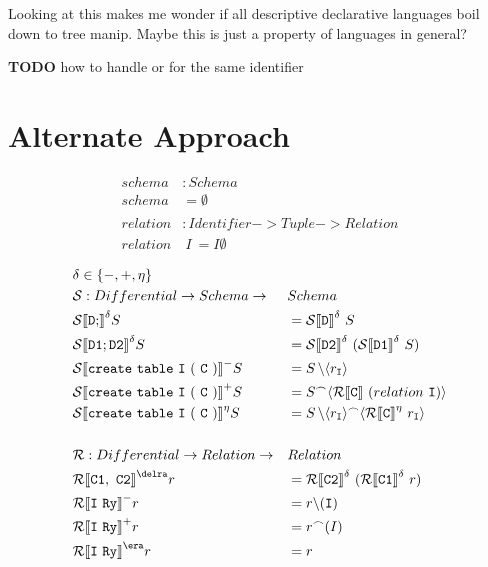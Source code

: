 \documentclass[12pt]{article}
\newcommand{\cmp}[2]{
  \mathcal{#1}|[ \mathtt{ \StrSubstitute{#2}{ }{\ } } |]
}
\begin{document}
\begin{description}
  \item Looking at this makes me wonder if all descriptive declarative languages boil down to tree manip. Maybe this is just a property of languages in general?

  \item \textbf{TODO} how to handle  or  for the same identifier
\end{description}

\newpage

\section{Alternate Approach}
\begin{align*}
  schema &: Schema \\
  schema &= \emptyset \\
   \\
  relation &: Identifier -> Tuple -> Relation \\
  relation&\ I\ = I\emptyset
\end{align*}

\begin{alignat*}{2}
  &\delta \in \{-, +, \eta \} &&\\
  &\mathcal{S} : Differential -> Schema -> &&Schema \\
  &\cmp{S}{D;}^{\delta}S &&= \cmp{S}{D}^{\delta}\ S \\
  &\cmp{S}{D1;D2}^{\delta}S &&= \cmp{S}{D2}^{\delta}\ (\cmp{S}{D1}^{\delta}\ S) \\
  &\cmp{S}{create table I ( C )}^{-}S &&= S\, \backslash \langle r_{\mathtt{I}}\rangle \\
  &\cmp{S}{create table I ( C )}^{+}S &&= S^{\frown}\langle \cmp{R}{C}\ (relation\ \mathtt{I})\rangle \\
  &\cmp{S}{create table I ( C )}^{\eta}S &&= S\, \backslash \langle r_{\mathtt{I}}\rangle^{\frown} \langle \cmp{R}{C}^{\eta}\ r_{\mathtt{I}}\rangle \\
  \\
  &\mathcal{R} : Differential -> Relation -> && Relation \\
  &\cmp{R}{C1, C2}^{\delra}r &&= \cmp{R}{C2}^{\delta}\ (\cmp{R}{C1}^{\delta}\ r) \\
  &\cmp{R}{I Ry}^{-}r &&= r \backslash (\mathtt{I}) \\
  &\cmp{R}{I Ry}^{+}r &&= r^{\frown} (I) \\
  &\cmp{R}{I Ry}^{\era}r &&= r
\end{alignat*}
\end{document}
